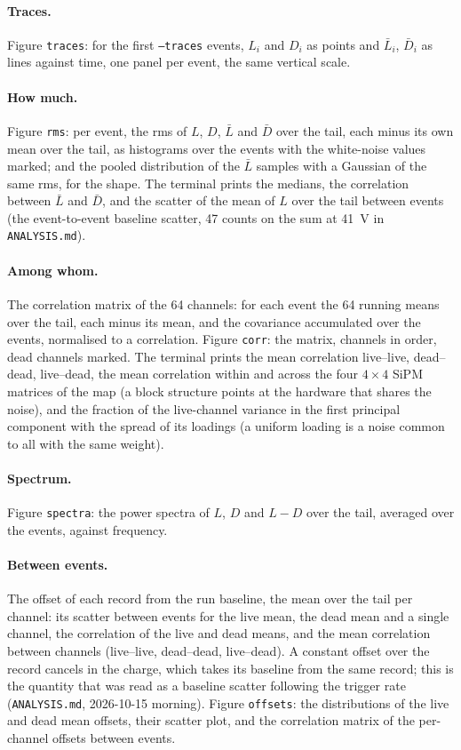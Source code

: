\documentclass[11pt]{article}
\newcommand{\code}[1]{\texttt{#1}}
\begin{document}
\paragraph{Traces.} Figure \code{traces}: for the first \code{--traces}
events, $L_i$ and $D_i$ as points and $\bar L_i$, $\bar D_i$ as lines
against time, one panel per event, the same vertical scale.

\paragraph{How much.} Figure \code{rms}: per event, the rms of $L$, $D$,
$\bar L$ and $\bar D$ over the tail, each minus its own mean over the
tail, as histograms over the events with the white-noise values marked;
and the pooled distribution of the $\bar L$ samples with a Gaussian of
the same rms, for the shape. The terminal prints the medians, the
correlation between $\bar L$ and $\bar D$, and the scatter of the mean of
$L$ over the tail between events (the event-to-event baseline scatter,
47 counts on the sum at 41~V in \code{ANALYSIS.md}).

\paragraph{Among whom.} The correlation matrix of the 64 channels: for
each event the 64 running means over the tail, each minus its mean, and
the covariance accumulated over the events, normalised to a correlation.
Figure \code{corr}: the matrix, channels in order, dead channels marked.
The terminal prints the mean correlation live--live, dead--dead,
live--dead, the mean correlation within and across the four $4\times4$
SiPM matrices of the map (a block structure points at the hardware that
shares the noise), and the fraction of the live-channel variance in the
first principal component with the spread of its loadings (a uniform
loading is a noise common to all with the same weight).

\paragraph{Spectrum.} Figure \code{spectra}: the power spectra of $L$,
$D$ and $L - D$ over the tail, averaged over the events, against
frequency.

\paragraph{Between events.} The offset of each record from the run
baseline, the mean over the tail per channel: its scatter between events
for the live mean, the dead mean and a single channel, the correlation
of the live and dead means, and the mean correlation between channels
(live--live, dead--dead, live--dead). A constant offset over the record
cancels in the charge, which takes its baseline from the same record;
this is the quantity that was read as a baseline scatter following the
trigger rate (\code{ANALYSIS.md}, 2026-10-15 morning). Figure
\code{offsets}: the distributions of the live and dead mean offsets,
their scatter plot, and the correlation matrix of the per-channel
offsets between events.
\end{document}
